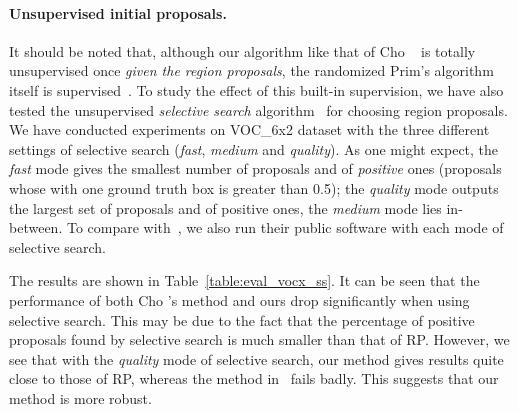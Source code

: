 \documentclass[10pt,twocolumn,letterpaper]{article}
\numberwithin{theorem}{section}
\begin{document}
\paragraph{Unsupervised initial proposals.} It should be noted that, although our algorithm like that of Cho \etal~\cite{CKSP15}  is totally unsupervised once {\em given the region
  proposals}, the randomized Prim's algorithm itself is
supervised~\cite{manen2013prime}. To study the effect of this built-in supervision, we have also
tested the unsupervised {\em selective search}
algorithm~\cite{UijlingsIJCV2013} for choosing region proposals. We
have conducted experiments on VOC\_6x2 dataset with the three
different settings of selective search ({\em fast}, {\em medium} and
{\em quality}). As one might expect, the {\em fast} mode gives
the smallest number of proposals and of \textit{positive} ones (proposals
whose  with one ground truth box is greater than 0.5); the {\em
  quality} mode outputs the largest set of proposals and of positive ones, 
  the {\em medium} mode lies in-between. To compare with~\cite{CKSP15}, we also run their public software with each mode of
selective search.

\begin{table}[H]
\centering
{}
\vspace{-2mm}
\caption{\small Object discovery on VOC\_6x2 with selective search and
  randomized Prim's as region proposal algorithms.}
\label{table:eval_vocx_ss}
\vspace{-3mm}
\end{table}

The results are shown in
Table~\ref{table:eval_vocx_ss}. It can be seen that the performance of both Cho \etal's method and ours drop significantly when using selective search. This may be due to the fact that the percentage of positive proposals found by selective search is much smaller than that of RP. However, we see that with the {\em quality} mode of selective
search, our method gives results quite close to those of 
RP, whereas the method in~\cite{CKSP15} fails badly.
This suggests that our method is more robust.
\end{document}
